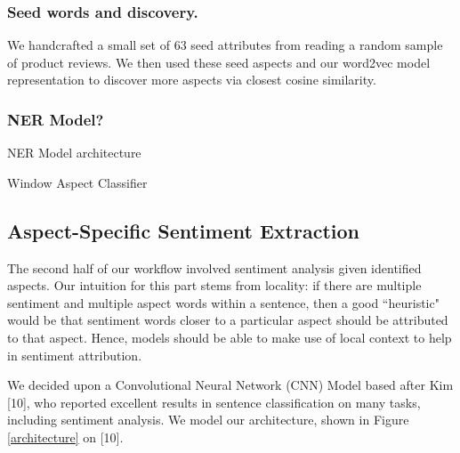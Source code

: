 \documentclass{article} %
\begin{document}
\subsubsection{Seed words and discovery.} We handcrafted a small set of 63 seed attributes from reading a random sample of product reviews. We then used these seed aspects and our word2vec model representation to discover more aspects via closest cosine similarity.

\subsubsection{NER Model?}

NER Model architecture

Window Aspect Classifier

\subsection{Aspect-Specific Sentiment Extraction}

The second half of our workflow involved sentiment analysis given identified aspects. Our intuition for this part stems from locality: if there are multiple sentiment and multiple aspect words within a sentence, then a good ``heuristic" would be that sentiment words closer to a particular aspect should be attributed to that aspect. Hence, models should be able to make use of local context to help in sentiment attribution.

We decided upon a Convolutional Neural Network (CNN) Model based after Kim [10], who reported excellent results in sentence classification on many tasks, including sentiment analysis. We model our architecture, shown in Figure \ref{architecture} on [10].


\end{document}
